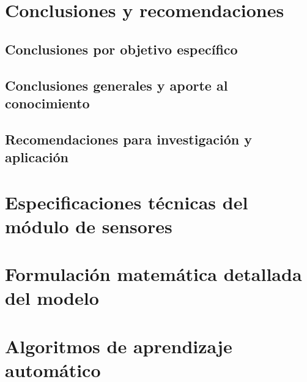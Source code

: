 \documentclass[10pt,spanish,fleqn,openany,twoside,letterpaper]{book}
\begin{document}
\chapter{Conclusiones y recomendaciones}

\section{Conclusiones por objetivo específico}
% 

\section{Conclusiones generales y aporte al conocimiento}
% 

\section{Recomendaciones para investigación y aplicación}
% 

\appendix
\renewcommand{\chaptername}{Anexo}

\chapter{Especificaciones técnicas del módulo de sensores}
% 

\chapter{Formulación matemática detallada del modelo}
 

\chapter{Algoritmos de aprendizaje automático}
% 
\end{document}
